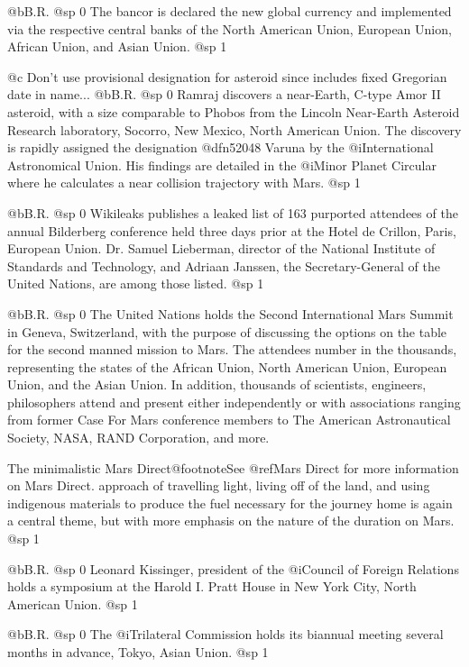 @b{B.R.}
@sp 0
The bancor is declared the new global currency and implemented via the respective central banks of the North American Union, European Union, African Union, and Asian Union.
@sp 1

@c Don't use provisional designation for asteroid since includes fixed Gregorian date in name...
@b{B.R.}
@sp 0
Ramraj discovers a near-Earth, C-type Amor II asteroid, with a size comparable to Phobos from the Lincoln Near-Earth Asteroid Research laboratory, Socorro, New Mexico, North American Union. The discovery is rapidly assigned the designation @dfn{52048 Varuna} by the @i{International Astronomical Union}. His findings are detailed in the @i{Minor Planet Circular} where he calculates a near collision trajectory with Mars.
@sp 1

@b{B.R.}
@sp 0
Wikileaks publishes a leaked list of 163 purported attendees of the annual Bilderberg conference held three days prior at the Hotel de Crillon, Paris, European Union. Dr. Samuel Lieberman, director of the National Institute of Standards and Technology, and Adriaan Janssen, the Secretary-General of the United Nations, are among those listed.
@sp 1

@b{B.R.}
@sp 0
The United Nations holds the Second International Mars Summit in Geneva, Switzerland, with the purpose of discussing the options on the table for the second manned mission to Mars. The attendees number in the thousands, representing the states of the African Union, North American Union, European Union, and the Asian Union. In addition, thousands of scientists, engineers, philosophers attend and present either independently or with associations ranging from former Case For Mars conference members to The American Astronautical Society, NASA, RAND Corporation, and more.

The minimalistic Mars Direct@footnote{See @ref{Mars Direct} for more information on Mars Direct.} approach of travelling light, living off of the land, and using indigenous materials to produce the fuel necessary for the journey home is again a central theme, but with more emphasis on the nature of the duration on Mars.
@sp 1

@b{B.R.}
@sp 0
Leonard Kissinger, president of the @i{Council of Foreign Relations} holds a symposium at the Harold I. Pratt House in New York City, North American Union.
@sp 1

@b{B.R.}
@sp 0
The @i{Trilateral Commission} holds its biannual meeting several months in advance, Tokyo, Asian Union.
@sp 1

